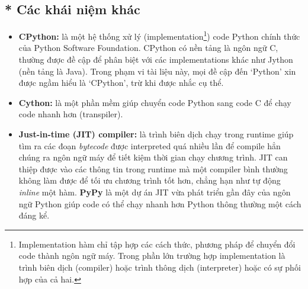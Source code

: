 \documentclass[12pt, a4paper, twoside]{article}
\begin{document}
\subsection*{* Các khái niệm khác}
\begin{itemize}
    \item \textbf{CPython:} là một hệ thống xử lý (implementation\footnote{Implementation hàm chỉ tập hợp các cách thức, phương pháp để chuyển đổi code thành ngôn ngữ máy. Trong phần lớn trường hợp implementation là trình biên dịch (compiler) hoặc trình thông dịch (interpreter) hoặc có sự phối hợp của cả hai.}) code Python chính thức của Python Software Foundation. CPython có nền tảng là ngôn ngữ C, thường được đề cập để phân biệt với các implementations khác như Jython (nền tảng là Java). Trong phạm vi tài liệu này, mọi đề cập đến `Python' xin được ngầm hiểu là `CPython', trừ khi được nhắc cụ thể.
    \item \textbf{Cython:} là một phần mềm giúp chuyển code Python sang code C để chạy code nhanh hơn (transpiler).
    \item \textbf{Just-in-time (JIT) compiler:} là trình biên dịch chạy trong runtime giúp tìm ra các đoạn \textit{bytecode} được interpreted quá nhiều lần để compile hẳn chúng ra ngôn ngữ máy để tiết kiệm thời gian chạy chương trình. JIT can thiệp được vào các thông tin trong runtime mà một compiler bình thường không làm được để tối ưu chương trình tốt hơn, chẳng hạn như tự động \textit{inline} một hàm. \textbf{PyPy} là một dự án JIT vừa phát triển gần đây của ngôn ngữ Python giúp code có thể chạy nhanh hơn Python thông thường một cách đáng kể.
\end{itemize}
\end{document}
